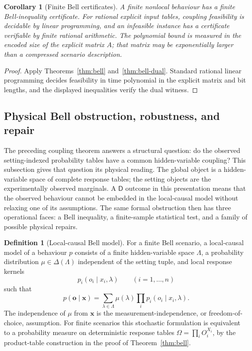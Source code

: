 \documentclass[11pt]{article}
\theoremstyle{plain}
\newtheorem{corollary}[theorem]{Corollary}
\theoremstyle{definition}
\newtheorem{definition}[theorem]{Definition}
\theoremstyle{remark}
\begin{document}
\begin{corollary}[Finite Bell certificates]\label{cor:bell-certificates}
A finite nonlocal behaviour has a finite Bell-inequality certificate. For
rational explicit input tables, coupling feasibility is decidable by linear
programming, and an infeasible instance has a certificate verifiable by finite
rational arithmetic. The polynomial bound is measured in the encoded size of
the explicit matrix $A$; that matrix may be exponentially larger than a
compressed scenario description.
\end{corollary}

\begin{proof}
Apply Theorems~\ref{thm:bell} and~\ref{thm:bell-dual}. Standard rational linear
programming decides feasibility in time polynomial in the explicit matrix and
bit lengths, and the displayed inequalities verify the dual witness.
\end{proof}



\subsection{Physical Bell obstruction, robustness, and repair}
\label{subsec:physical-bell}

The preceding coupling theorem answers a structural question: do the observed
setting-indexed probability tables have a common hidden-variable coupling? This
subsection gives that question its physical reading. The global object is a
hidden-variable space of complete response tables; the setting objects are the
experimentally observed marginals. A \(\mathsf D\) outcome in this presentation
means that the observed behaviour cannot be embedded in the local-causal model
without relaxing one of its assumptions. The same formal obstruction then has
three operational faces: a Bell inequality, a finite-sample statistical test, and
a family of possible physical repairs.

\begin{definition}[Local-causal Bell model]
\label{def:local-causal-bell}
For a finite Bell scenario, a local-causal model of a behaviour \(p\) consists of
a finite hidden-variable space \(\Lambda\), a probability distribution
\(\mu\in\Delta(\Lambda)\) independent of the setting tuple, and local response
kernels
\[
p_i(o_i\mid x_i,\lambda)
\qquad(i=1,\ldots,n)
\]
such that
\[
p(\mathbf o\mid\mathbf x)
=
\sum_{\lambda\in\Lambda}
\mu(\lambda)
\prod_i p_i(o_i\mid x_i,\lambda).
\]
The independence of \(\mu\) from \(\mathbf x\) is the measurement-independence, or
freedom-of-choice, assumption. For finite scenarios this stochastic formulation
is equivalent to a probability measure on deterministic response tables
\(\Omega=\prod_iO_i^{X_i}\), by the product-table construction in the proof of
Theorem~\ref{thm:bell}.
\end{definition}
\end{document}
